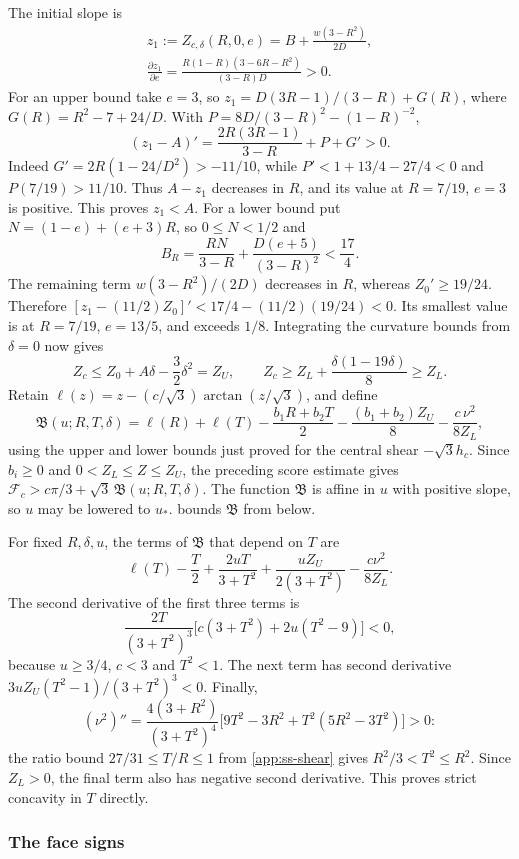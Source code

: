 The initial slope is
\begin{gather*}
 z_1:=Z_{c,\delta}(R,0,e)=B+\frac{w(3-R^2)}{2D},\\
 \frac{\partial z_1}{\partial e}
 =\frac{R(1-R)(3-6R-R^2)}{(3-R)D}>0.
\end{gather*}
For an upper bound take $e=3$, so
$z_1=D(3R-1)/(3-R)+G(R)$, where $G(R)=R^2-7+24/D$.
With $P=8D/(3-R)^2-(1-R)^{-2}$,
\[
 (z_1-A)'=\frac{2R(3R-1)}{3-R}+P+G'>0.
\]
Indeed $G'=2R(1-24/D^2)>-11/10$, while
$P'<1+13/4-27/4<0$ and $P(7/19)>11/10$.
Thus $A-z_1$ decreases in $R$, and its value at $R=7/19$, $e=3$ is positive.
This proves $z_1<A$.
For a lower bound put $N=(1-e)+(e+3)R$, so $0\le N<1/2$ and
\[
 B_R=\frac{RN}{3-R}+\frac{D(e+5)}{(3-R)^2}<\frac{17}{4}.
\]
The remaining term $w(3-R^2)/(2D)$ decreases in $R$, whereas $Z_0'\ge19/24$.
Therefore $[z_1-(11/2)Z_0]'<17/4-(11/2)(19/24)<0$.
Its smallest value is at $R=7/19$, $e=13/5$, and exceeds $1/8$.
Integrating the curvature bounds from $\delta=0$ now gives
\[
 Z_c\le Z_0+A\delta-\frac32\delta^2=Z_U,\qquad
 Z_c\ge Z_L+\frac{\delta(1-19\delta)}8\ge Z_L.
\]
 Retain
$\ell(z)=z-(c/\sqrt3)\arctan(z/\sqrt3)$, and define
\[
  \mathfrak B(u;R,T,\delta)=\ell(R)+\ell(T)-\frac{b_1R+b_2T}{2}-\frac{(b_1+b_2)Z_U}{8}
   -\frac{c\,\nu^2}{8Z_L},
\]
using the upper and lower bounds just proved for the central shear $-\sqrt3h_c$.
Since $b_i\ge0$ and $0<Z_L\le Z\le Z_U$, the preceding score estimate gives
$\mathcal F_c>c\pi/3+\sqrt3\,\mathfrak B(u;R,T,\delta)$.
The function $\mathfrak B$ is affine in $u$ with positive slope, so $u$ may be lowered to $u_*$.
 bounds $\mathfrak B$ from below.

 For fixed $R,\delta,u$, the terms of
$\mathfrak B$ that depend on $T$ are
\[
 \ell(T)-\frac T2+\frac{2uT}{3+T^2}
       +\frac{uZ_U}{2(3+T^2)}-\frac{c\nu^2}{8Z_L}.
\]
The second derivative of the first three terms is
\[
 \frac{2T}{(3+T^2)^3}\bigl[c(3+T^2)+2u(T^2-9)\bigr]<0,
\]
because $u\ge3/4$, $c<3$ and $T^2<1$. The next term has second derivative
$3uZ_U(T^2-1)/(3+T^2)^3<0$. Finally,
\[
 (\nu^2)''=\frac{4(3+R^2)}{(3+T^2)^4}
 \bigl[9T^2-3R^2+T^2(5R^2-3T^2)\bigr]>0:
\]
the ratio bound $27/31\le T/R\le1$ from \cref{app:ss-shear} gives
$R^2/3<T^2\le R^2$. Since $Z_L>0$, the final term also has negative second derivative.
This proves strict concavity in $T$ directly.

\subsubsection{The face signs}\label{app:ss-faces}

